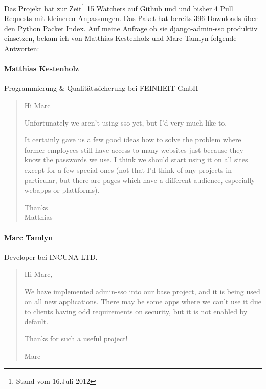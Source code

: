 Das Projekt hat zur Zeit\footnote{Stand vom 16.Juli 2012} 15 Watchers auf Github und und bisher 4 Pull Requests mit kleineren Anpassungen. Das Paket hat bereits 396 Downloads über den Python Packet Index. Auf meine Anfrage ob sie django-admin-sso produktiv einsetzen, bekam ich von Matthias Kestenholz und Marc Tamlyn folgende Antworten:

\paragraph{Matthias Kestenholz}
Programmierung \& Qualitätssicherung bei FEINHEIT GmbH
\begin{quote}
  Hi Marc

  Unfortunately we aren't using sso yet, but I'd very much like to.

  It certainly gave us a few good ideas how to solve the problem where
  former employees still have access to many websites just because they
  know the passwords we use. I think we should start using it on all
  sites except for a few special ones (not that I'd think of any
  projects in particular, but there are pages which have a different
  audience, especially webapps or plattforms).


  Thanks \\
  Matthias
\end{quote}

\paragraph{Marc Tamlyn}
Developer bei INCUNA LTD.
\begin{quote}
  Hi Marc,

  We have implemented admin-sso into our base project, and it is being used on all new applications. There may be some apps where we can't use it due to clients having odd requirements on security, but it is not enabled by default.

  Thanks for such a useful project!

  Marc
\end{quote}
